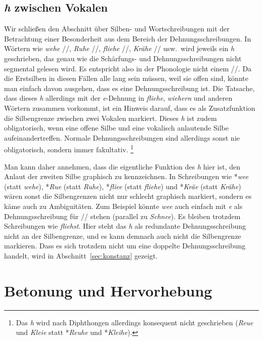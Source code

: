 \subsection{\textit{h} zwischen Vokalen}

\label{sec:intervokh}

Wir schließen den Abschnitt über Silben- und Wortschreibungen mit der Betrachtung einer Besonderheit aus dem Bereich der Dehnungsschreibungen.
In Wörtern wie \textit{wehe} //, \textit{Ruhe} //, \textit{fliehe} //, \textit{Krähe} // usw.\ wird jeweils ein \textit{h} geschrieben, das genau wie die Schärfungs- und Dehnungsschreibungen nicht segmental gelesen wird.
Es entspricht also in der Phonologie nicht einem //.
Da die Erstsilben in diesen Fällen alle lang sein müssen, weil sie offen sind, könnte man einfach davon ausgehen, dass es eine Dehnungsschreibung ist.
Die Tatsache, dass dieses \textit{h} allerdings mit der \textit{e}-Dehnung in \textit{fliehe}, \textit{wiehern} und anderen Wörtern zusammen vorkommt, ist ein Hinweis darauf, dass es als Zusatzfunktion die Silbengrenze zwischen zwei Vokalen markiert.
Dieses \textit{h} ist zudem obligatorisch, wenn eine offene Silbe und eine vokalisch anlautende Silbe aufeinandertreffen.
Normale Dehnungsschreibungen sind allerdings sonst nie obligatorisch, sondern immer fakultativ.%
\footnote{Das \textit{h} wird nach Diphthongen allerdings konsequent nicht geschrieben (\zB \textit{Reue} und \textit{Kleie} statt *\textit{Reuhe} und *\textit{Kleihe}).}

Man kann daher annehmen, dass die eigentliche Funktion des \textit{h} hier ist, den Anlaut der zweiten Silbe graphisch zu kennzeichnen.
In Schreibungen wie *\textit{wee} (statt \textit{wehe}), *\textit{Rue} (statt \textit{Ruhe}), *\textit{fliee} (statt \textit{fliehe}) und *\textit{Kräe} (statt \textit{Krähe}) wären sonst die Silbengrenzen nicht nur schlecht graphisch markiert, sondern es käme auch zu Ambiguitäten.
Zum Beispiel könnte \textit{wee} auch einfach mit \textit{e} als Dehnungsschreibung für // stehen (parallel zu \textit{Schnee}).
Es bleiben trotzdem Schreibungen wie \textit{fliehst}.
Hier steht das \textit{h} als redundante Dehnungsschreibung nicht an der Silbengrenze, und es kann demnach auch nicht die Silbengrenze markieren.
Dass es sich trotzdem nicht um eine doppelte Dehnungsschreibung handelt, wird in Abschnitt~\ref{sec:konstanz} gezeigt.

\section{Betonung und Hervorhebung}


